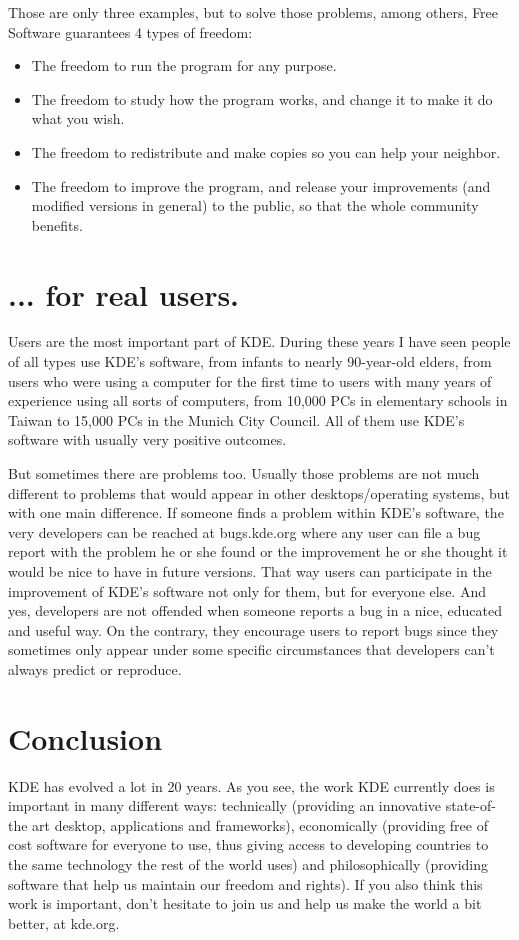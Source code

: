 Those are only three examples, but to solve those problems, among others, Free Software guarantees 4 types of freedom:

\begin{itemize}
\item The freedom to run the program for any purpose.
\item The freedom to study how the program works, and change it to make it do what you wish.
\item The freedom to redistribute and make copies so you can help your neighbor.
\item The freedom to improve the program, and release your improvements (and modified versions in general) to the public, so that the whole community benefits.
\end{itemize}

\section*{... for real users.}

Users are the most important part of KDE. During these years I have seen people of all types use KDE's software, from infants to nearly 90-year-old elders, from users who were using a computer for the first time to users with many years of experience using all sorts of computers, from 10,000 PCs in elementary schools in Taiwan to 15,000 PCs in the Munich City Council. All of them use KDE's software with usually very positive outcomes.

But sometimes there are problems too. Usually those problems are not much different to problems that would appear in other desktops/operating systems, but with one main difference. If someone finds a problem within KDE's software, the very developers can be reached at bugs.kde.org where any user can file a bug report with the problem he or she found or the improvement he or she thought it would be nice to have in future versions. That way users can participate in the improvement of KDE's software not only for them, but for everyone else. And yes, developers are not offended when someone reports a bug in a nice, educated and useful way. On the contrary, they encourage users to report bugs since they sometimes only appear under some specific circumstances that developers can't always predict or reproduce.

\section*{Conclusion}
KDE has evolved a lot in 20 years. As you see, the work KDE currently does is important in many different ways: technically (providing an innovative state-of-the art desktop, applications and frameworks), economically (providing free of cost software for everyone to use, thus giving access to developing countries to the same technology the rest of the world uses) and philosophically (providing software that help us maintain our freedom and rights). If you also think this work is important, don't hesitate to join us and help us make the world a bit better, at kde.org.
